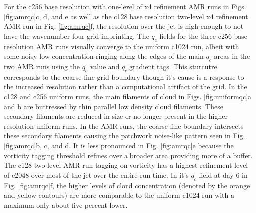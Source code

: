 For the c256 base resolution with one-level of x4 refinement AMR runs 
in Figs. \ref{fig:amrqc}c, d, and e as well as the c128 base resolution two-level x4 
refinement AMR run in Fig. \ref{fig:amrqc}f, the resolution over the jet is high enough
to not have the wavenumber four grid imprinting. The $q_c$ fields for the
 three c256 base resolution AMR runs visually converge to the uniform c1024 run,
 albeit with some noisy low concentration ringing along the edges of the main $q_c$ areas
 in the two AMR runs using the $q_c$ value and $q_c$ gradient tags. This sturcutre
corresponds to the coarse-fine grid boundary though it's cause is a response to the increased
resolution rather than a computational artifact of the grid.
In the c128 and c256 uniform runs, the main filaments of cloud in Figs. \ref{fig:uniformqc}a and b
are buttressed by thin parallel low density cloud filaments. These secondary filaments are reduced 
in size or no longer present in the higher resolution uniform runs. In the AMR runs, the coarse-fine
boundary intersects these secondary filaments causing the patchwork noise-like pattern seen in
Fig. \ref{fig:amrqc}b, c, and d. It is less pronounced in Fig. \ref{fig:amrqc}e because the vorticity 
tagging threshold refines over a broader area providing more of a buffer. The c128 two-level
AMR run tagging on vorticity has a highest refinement level of c2048 over most of the jet over
the entire run time. In it's $q_c$ field at day 6 in Fig. \ref{fig:amrqc}f, the higher levels of cloud 
concentration (denoted by the orange and yellow contours) are more comparable to the uniform c1024 run
with a maximum only about five percent lower.
 
